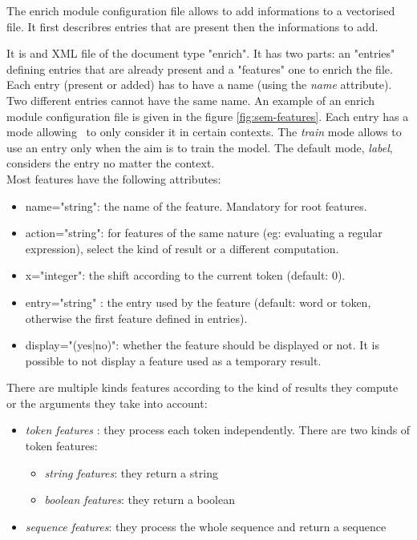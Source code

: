 \documentclass[manual-fr.tex]{subfiles}
\begin{document}
The enrich module configuration file allows to add informations to a vectorised file. It first describres entries that are present then the informations to add.

It is and XML file of the document type "enrich". It has two parts: an "entries" defining entries that are already present and a "features" one to enrich the file.\\

Each entry (present or added) has to have a name (using the \emph{name} attribute). Two different entries cannot have the same name. An example of an enrich module configuration file is given in the figure \ref{fig:sem-features}. Each entry has a mode allowing \SEM\ to only consider it in certain contexts. The \emph{train} mode allows to use an entry only when the aim is to train the model. The default mode, \emph{label}, considers the entry no matter the context.\\

Most features have the following attributes:
\begin{itemize}
    \item name="string": the name of the feature. Mandatory for root features.
    \item action="string": for features of the same nature (eg: evaluating a regular expression), select the kind of result or a different computation.
    \item x="integer": the shift according to the current token (default: 0).
    \item entry="string" : the entry used by the feature (default: word or token, otherwise the first feature defined in entries).
    \item display="(yes|no)": whether the feature should be displayed or not. It is possible to not display a feature used as a temporary result.
\end{itemize}

There are multiple kinds features according to the kind of results they compute or the arguments they take into account:
\begin{itemize}
    \item \emph{token features} : they process each token independently. There are two kinds of token features:
    \begin{itemize}
        \item \emph{string features}: they return a string
        \item \emph{boolean features}: they return a boolean
    \end{itemize}
    \item \emph{sequence features}: they process the whole sequence and return a sequence
\end{itemize}
\end{document}
